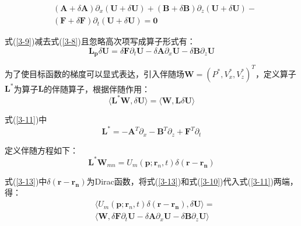 \documentclass[12pt]{article}
\begin{document}
\begin{equation}\label{3-9}
\begin{split}
&(\boldsymbol{A}+\delta\boldsymbol{A})\partial_x (\boldsymbol{U}+\delta\boldsymbol{U})+(\boldsymbol{B}+\delta\boldsymbol{B})\partial_z (\boldsymbol{U}+\delta\boldsymbol{U})-\\
&(\boldsymbol{F}+\delta\boldsymbol{F})\partial_t (\boldsymbol{U}+\delta\boldsymbol{U})=\boldsymbol{0}
\end{split}
\end{equation}
\par
式(\ref{3-9})减去式(\ref{3-8})且忽略高次项写成算子形式有：
\begin{equation}\label{3-10}
\boldsymbol{L_p}\delta\boldsymbol{U}=\delta\boldsymbol{F}\partial_t \boldsymbol{U}-\delta\boldsymbol{A}\partial_x \boldsymbol{U}-\delta\boldsymbol{B}\partial_z \boldsymbol{U}
\end{equation}
\par
为了使目标函数的梯度可以显式表达，引入伴随场$\boldsymbol{W}=(P^*,V_x^*,V_z^*)^T$，定义算子$\boldsymbol{L}^*$为算子$\boldsymbol{L}$的伴随算子，根据伴随作用：
\begin{equation}\label{3-11}
\langle\boldsymbol{L}^*\boldsymbol{W},\delta\boldsymbol{U}\rangle=\langle\boldsymbol{W},\boldsymbol{L}\delta\boldsymbol{U}\rangle
\end{equation}
\par
式(\ref{3-11})中
\begin{equation}\label{3-12}
\boldsymbol{L}^*=-\boldsymbol{A}^T\partial_x-\boldsymbol{B}^T\partial_z+\boldsymbol{F}^T\partial_t
\end{equation}
\par
定义伴随方程如下：
\begin{equation}\label{3-13}
\boldsymbol{L}^*\boldsymbol{W}_{mn}=U_m(\boldsymbol{p};\boldsymbol{r}_n,t)\delta(\boldsymbol{r-r_n})
\end{equation}
\par
式(\ref{3-13})中$\delta(\boldsymbol{r-r_n})$为Dirac函数，将式(\ref{3-13})和式(\ref{3-10})代入式(\ref{3-11})两端，得：
\begin{equation}\label{3-14}
\begin{split}
&\langle U_m(\boldsymbol{p};\boldsymbol{r}_n,t)\delta(\boldsymbol{r-r_n}),\delta\boldsymbol{U}\rangle=\\
&\langle\boldsymbol{W},\delta\boldsymbol{F}\partial_t \boldsymbol{U}-\delta\boldsymbol{A}\partial_x \boldsymbol{U}-\delta\boldsymbol{B}\partial_z \boldsymbol{U}\rangle
\end{split}
\end{equation}
\end{document}
